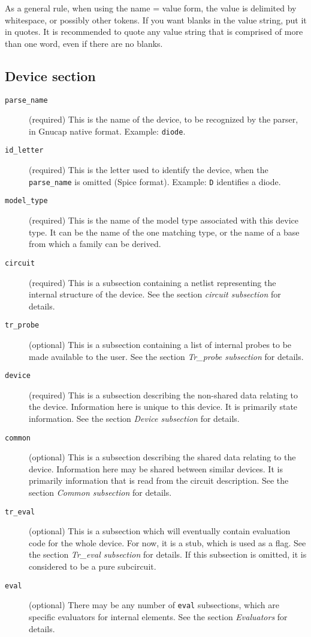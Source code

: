As a general rule, when using the name = value form, the value is
delimited by whitespace, or possibly other tokens.  If you want blanks
in the value string, put it in quotes.  It is recommended to quote any
value string that is comprised of more than one word, even if there
are no blanks.
\subsection{Device section}

\begin{description}

\item[{\tt parse\_name}] (required)
This is the name of the device, to be recognized by the parser, in
Gnucap native format.  Example: {\tt diode}.

\item[{\tt id\_letter}] (required)
This is the letter used to identify the device, when the {\tt
parse\_name} is omitted (Spice format).  Example: {\tt D} identifies a
diode.

\item[{\tt model\_type}] (required)
This is the name of the model type associated with this device type.
It can be the name of the one matching type, or the name of a base
from which a family can be derived.

\item[{\tt circuit}] (required)
This is a subsection containing a netlist representing the internal
structure of the device.  See the section {\em circuit subsection} for
details.

\item[{\tt tr\_probe}] (optional)
This is a subsection containing a list of internal probes to be made
available to the user.  See the section {\em Tr\_probe subsection} for
details.

\item[{\tt device}] (required)
This is a subsection describing the non-shared data relating to the
device.  Information here is unique to this device.  It is primarily
state information.  See the section {\em Device subsection} for
details.

\item[{\tt common}] (optional)
This is a subsection describing the shared data relating to the device.
Information here may be shared between similar devices.  It is
primarily information that is read from the circuit description.  See
the section {\em Common subsection} for details.

\item[{\tt tr\_eval}] (optional)
This is a subsection which will eventually contain evaluation code for
the whole device.  For now, it is a stub, which is used as a flag.
See the section {\em Tr\_eval subsection} for details.  If this
subsection is omitted, it is considered to be a pure subcircuit.

\item[{\tt eval}] (optional)
There may be any number of {\tt eval} subsections, which are specific
evaluators for internal elements.  See the section {\em Evaluators}
for details.

\end{description}
